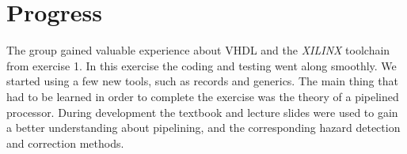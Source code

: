\section{Progress}
The group gained valuable experience about VHDL and the \textit{XILINX} toolchain from exercise 1.
In this exercise the coding and testing went along smoothly.
We started using a few new tools, such as records and generics.
The main thing that had to be learned in order to complete the exercise
was the theory of a pipelined processor.
During development the textbook and lecture slides were used to gain a better understanding about pipelining,
and the corresponding hazard detection and correction methods.
